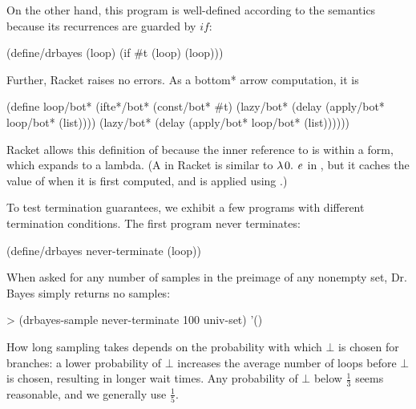On the other hand, this program is well-defined according to the semantics because its recurrences are guarded by $if$:
\begin{center}\singlespacing
\begin{schemedisplay}
(define/drbayes (loop) (if #t (loop) (loop)))
\end{schemedisplay}
\end{center}
Further, Racket raises no errors.
As a bottom* arrow computation, it is
\begin{center}\singlespacing
\begin{schemedisplay}
(define loop/bot*
  (ifte*/bot* (const/bot* #t)
              (lazy/bot* (delay (apply/bot* loop/bot* (list))))
              (lazy/bot* (delay (apply/bot* loop/bot* (list))))))
\end{schemedisplay}
\end{center}
Racket allows this definition of  because the inner reference to  is within a  form, which expands to a lambda.
(A  in Racket is similar to $\lambda\mspace{2mu}{0}\ldotp\, \mathit{e}$ in \lzfclang, but it caches the value of  when it is first computed, and is applied using .)

To test termination guarantees, we exhibit a few programs with different termination conditions.
The first program never terminates:
\begin{center}\singlespacing
\begin{schemedisplay}
(define/drbayes never-terminate (loop))
\end{schemedisplay}
\end{center}
When asked for any number of samples in the preimage of any nonempty set, Dr. Bayes simply returns no samples:
\begin{center}\singlespacing
\begin{schemedisplay}
> (drbayes-sample never-terminate 100 univ-set)
'()
\end{schemedisplay}
\end{center}
How long sampling takes depends on the probability with which $\bot$ is chosen for branches: a lower probability of $\bot$ increases the average number of loops before $\bot$ is chosen, resulting in longer wait times.
Any probability of $\bot$ below $\frac{1}{3}$ seems reasonable, and we generally use $\frac{1}{5}$.

